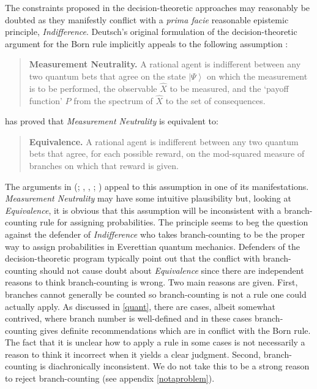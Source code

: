 \documentclass[onecolumn,secnumarabic,amsmath,amssymb,balancelastpage,nofootinbib]{article}
\newcommand{\ket}[1]{\ensuremath{\left|#1\right\rangle}}
\begin{document}
The constraints proposed in the decision-theoretic approaches may reasonably be doubted as they manifestly conflict with a \emph{prima facie} reasonable epistemic principle, \emph{Indifference}.  Deutsch's original formulation of the decision-theoretic argument for the Born rule implicitly appeals to the following assumption \citep{wallace2003b}:
\begin{quotation}
\noindent\small{\textbf{Measurement Neutrality.}  A rational agent is indifferent between any two quantum bets that agree on the state $\ket{\Psi}$  on which the measurement is to be performed, the observable $\widehat{X}$ to be measured, and the `payoff function' $P$ from the spectrum of $\widehat{X}$ to the set of consequences. \citep[p. 119]{greaves2007}}
\end{quotation}
\citet{wallace2007} has proved that \textit{Measurement Neutrality} is equivalent to:
\begin{quotation}
\noindent\small{\textbf{Equivalence.}  A rational agent is indifferent between any two quantum bets that agree, for each possible reward, on the mod-squared measure of branches on which that reward is given. \citep[p. 119]{greaves2007}}
\end{quotation}
The arguments in (\citealp{deutsch1999}; \citeauthor{greaves2004}, \citeyear{greaves2004}, \citeyear{greaves2007}; \citealp{wallace2003b}) appeal to this assumption in one of its manifestations. \emph{Measurement Neutrality} may have some intuitive plausibility but, looking at \emph{Equivalence}, it is obvious that this assumption will be inconsistent with a branch-counting rule for assigning probabilities.  The principle seems to beg the question against the defender of \emph{Indifference} who takes branch-counting to be the proper way to assign probabilities in Everettian quantum mechanics.  Defenders of the decision-theoretic program typically point out that the conflict with branch-counting should not cause doubt about \emph{Equivalence} since there are independent reasons to think branch-counting is wrong.  Two main reasons are given.  First, branches cannot generally be counted so branch-counting is not a rule one could actually apply.  As discussed in \textsection \ref{quant}, there are cases, albeit somewhat contrived, where branch number is well-defined and in these cases branch-counting gives definite recommendations which are in conflict with the Born rule. {The fact that} it is unclear how to apply a rule in some cases is not necessarily a reason to think it incorrect when it yields a clear judgment.  Second, branch-counting is diachronically inconsistent.  We do not take this to be a strong reason to reject branch-counting (see appendix \ref{notaproblem}).
 
\end{document}
